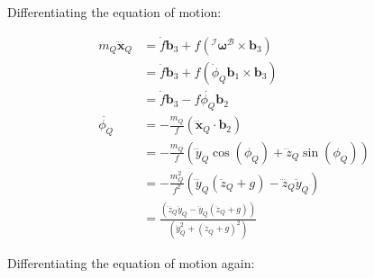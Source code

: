\documentclass[11pt]{article}
\begin{document}
Differentiating the equation of motion:

\begin{align*}
m_Q \mathbf{\dddot{x}}_Q &= \dot{f} \mathbf{b}_3 + f \left( {}^\mathcal{I} \mathbf{\omega}^\mathcal{B} \times \mathbf{b}_3 \right) \\
&= \dot{f} \mathbf{b}_3 + f \left( \dot{\phi}_Q \mathbf{b}_1 \times \mathbf{b}_3 \right) \\
&= \dot{f} \mathbf{b}_3 - f \dot{\phi_Q} \mathbf{b}_2 \\
\dot{\phi_Q} &= - \frac{m_Q}{f} \left( \mathbf{\dddot{x}}_Q \cdot \mathbf{b}_2 \right) \\
&= - \frac{m_Q}{f} \left( \dddot{y}_Q \cos(\phi_Q) + \dddot{z}_Q \sin(\phi_Q) \right) \\
&= - \frac{m_Q^2}{f^2} \left( \dddot{y}_Q (\ddot{z}_Q + g) - \dddot{z}_Q \ddot{y}_Q \right) \\
&= \frac{ \left( \dddot{z}_Q \ddot{y}_Q - \dddot{y}_Q (\ddot{z}_Q + g) \right) } { \left( \ddot{y}_Q^2 + (\ddot{z}_Q + g)^2 \right) }
\end{align*}

Differentiating the equation of motion again: 
\end{document}
